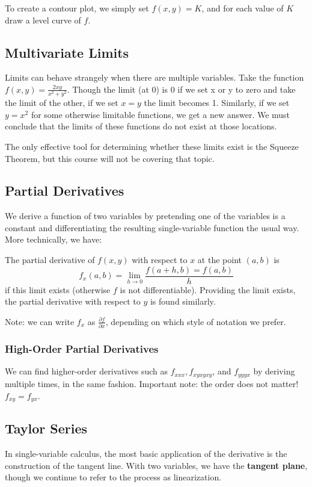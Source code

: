 \documentclass[12pt]{article}
\begin{document}
To create a contour plot, we simply set $f(x,y) = K$, and for each value of $K$ draw a level curve of $f$.

\subsection*{Multivariate Limits}
Limits can behave strangely when there are multiple variables. Take the function $f(x,y) = \frac{2xy}{x^2 + y^2}$. Though the limit (at 0) is 0 if we set x or y to zero and take the limit of the other, if we set $x = y$ the limit becomes 1. Similarly, if we set $y = x^2$ for some otherwise limitable functions, we get a new answer. We must conclude that the limits of these functions do not exist at those locations.

The only effective tool for determining whether these limits exist is the Squeeze Theorem, but this course will not be covering that topic.

\subsection*{Partial Derivatives}
We derive a function of two variables by pretending one of the variables is a constant and differentiating the resulting single-variable function the usual way. More technically, we have:

 The partial derivative of $f(x,y)$ with respect to $x$ at the point $(a,b)$ is \[ f_x(a,b) = \lim_{h\to 0} \frac{f(a+h, b) = f(a,b)}{h} \] if this limit exists (otherwise $f$ is not differentiable). Providing the limit exists, the partial derivative with respect to $y$ is found similarly.

Note: we can write $f_x$ as $\frac{\partial f}{\partial x}$, depending on which style of notation we prefer.

\subsubsection*{High-Order Partial Derivatives}
We can find higher-order derivatives such as $f_{xxx}, f_{xyxyxy}$, and $f_{yyyx}$ by deriving multiple times, in the same fashion. Important note: the order does not matter! $f_{xy} = f_{yx}$.

\subsection*{Taylor Series}
In single-variable calculus, the most basic application of the derivative is the construction of the tangent line. With two variables, we have the {\bf tangent plane}, though we continue to refer to the process as linearization.
\end{document}
